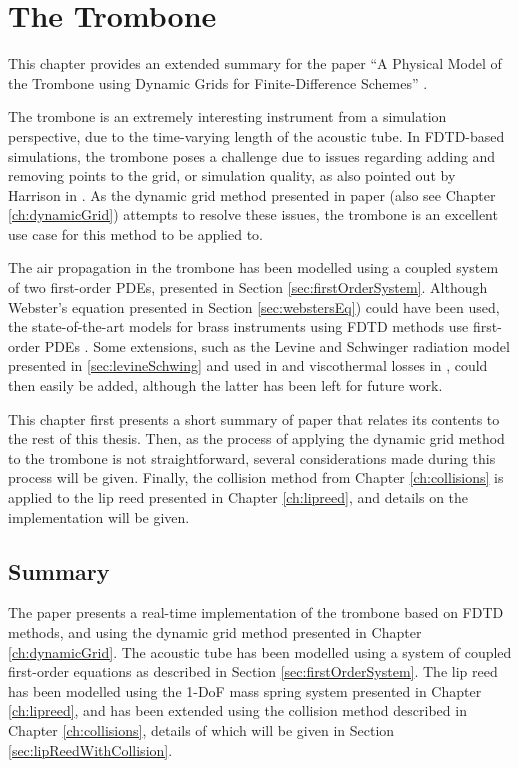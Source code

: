 \chapter{The Trombone}\label{ch:trombone}
This chapter provides an extended summary for the paper ``A Physical Model of the Trombone using Dynamic Grids for Finite-Difference Schemes'' \citeP[H]. 

The trombone is an extremely interesting instrument from a simulation perspective, due to the time-varying length of the acoustic tube. In FDTD-based simulations, the trombone poses a challenge due to issues regarding adding and removing points to the grid, or simulation quality, as also pointed out by Harrison in \cite{Harrison2018}. As the dynamic grid method presented in paper \citeP[G] (also see Chapter \ref{ch:dynamicGrid}) attempts to resolve these issues, the trombone is an excellent use case for this method to be applied to. 

The air propagation in the trombone has been modelled using a coupled system of two first-order PDEs, presented in Section \ref{sec:firstOrderSystem}. Although Webster's equation presented in Section \ref{sec:webstersEq}) could have been used, the state-of-the-art models for brass instruments using FDTD methods use first-order PDEs \cite{Bilbao2016, Harrison2018}. Some extensions, such as the Levine and Schwinger radiation model presented in \ref{sec:levineSchwing} and used in \cite{Harrison2018} and viscothermal losses in \cite{Bilbao2016}, could then easily be added, although the latter has been left for future work.

This chapter first presents a short summary of paper \citeP[H] that relates its contents to the rest of this thesis. Then, as the process of applying the dynamic grid method to the trombone is not straightforward, several considerations made during this process will be given. Finally, the collision method from Chapter \ref{ch:collisions} is applied to the lip reed presented in Chapter \ref{ch:lipreed},
and details on the implementation will be given. 


\section{Summary}
The paper presents a real-time implementation of the trombone based on FDTD methods, and using the dynamic grid method presented in Chapter \ref{ch:dynamicGrid}. The acoustic tube has been modelled using a system of coupled first-order equations as described in Section \ref{sec:firstOrderSystem}. The lip reed has been modelled using the 1-DoF mass spring system presented in Chapter \ref{ch:lipreed}, and has been extended using the collision method described in Chapter \ref{ch:collisions}, details of which will be given in Section \ref{sec:lipReedWithCollision}. 

